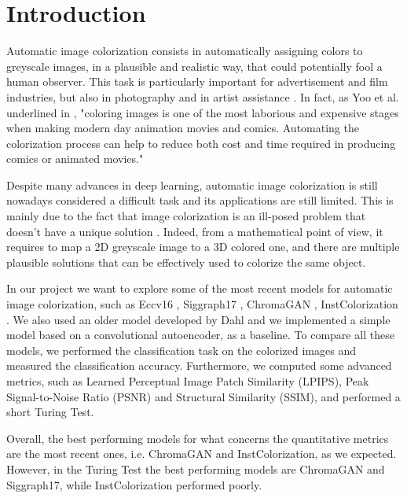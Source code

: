 \section{Introduction}
Automatic image colorization consists in automatically assigning colors to greyscale images, in a plausible and
realistic way, that could potentially fool a human observer. This task is particularly important for advertisement
and film industries, but also in photography and in artist assistance \cite{chromagan}.
In fact, as Yoo et al. underlined in \cite{animation}, "coloring images is one of the most laborious and expensive
stages when making modern day animation movies and comics. Automating the colorization process can help to reduce
both cost and time required in producing comics or animated movies."

Despite many advances in deep learning, automatic image colorization is still nowadays considered a difficult task
and its applications are still limited. This is mainly due to the fact that image colorization is an ill-posed
problem that doesn't have a unique solution \cite{su} \cite{chromagan}. Indeed, from a mathematical point of view,
it requires to map a 2D greyscale image to a 3D colored one, and there are multiple plausible solutions that can
be effectively used to colorize the same object.

In our project we want to explore some of the most recent models for automatic image colorization, such as
Eccv16 \cite{zhang}, Siggraph17 \cite{siggraph}, ChromaGAN \cite{chromagan}, InstColorization \cite{su}.
We also used an older model developed by Dahl \cite{dahl} and we implemented a simple model based on a
convolutional autoencoder, as a baseline.
To compare all these models, we performed the classification task on the colorized images and measured the
classification accuracy. Furthermore, we computed some advanced metrics, such as Learned Perceptual Image Patch
Similarity (LPIPS), Peak Signal-to-Noise Ratio (PSNR) and Structural Similarity (SSIM), and performed a short
Turing Test.

Overall, the best performing models for what concerns the quantitative metrics are the most recent ones,
i.e. ChromaGAN and InstColorization, as we expected. However, in the Turing Test the best performing models
are ChromaGAN and Siggraph17, while InstColorization performed poorly.




